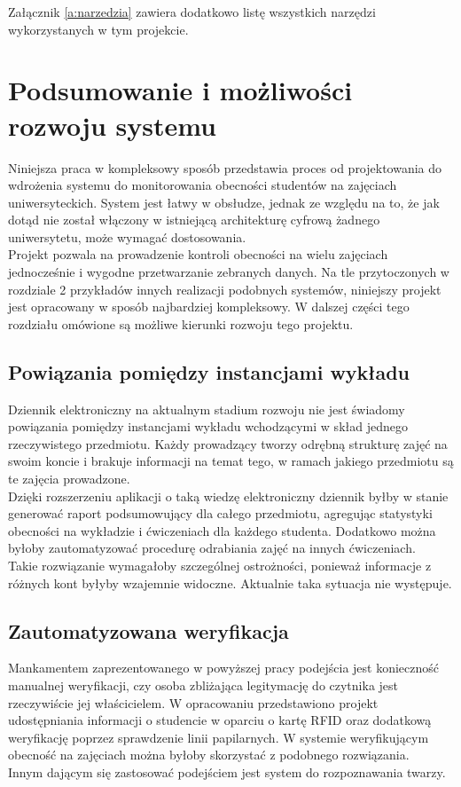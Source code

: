 \documentclass[declaration,shortabstract, mgr]{iithesis}
\begin{document}
Załącznik \ref{a:narzedzia} zawiera dodatkowo listę wszystkich narzędzi wykorzystanych w tym projekcie.

\chapter{Podsumowanie i możliwości rozwoju systemu}
\indent Niniejsza praca w kompleksowy sposób przedstawia proces od projektowania do wdrożenia systemu do monitorowania obecności studentów na zajęciach uniwersyteckich. System jest łatwy w obsłudze, jednak ze względu na to, że jak dotąd nie został włączony w istniejącą architekturę cyfrową żadnego uniwersytetu, może wymagać dostosowania. \\
\indent Projekt pozwala na prowadzenie kontroli obecności na wielu zajęciach jednocześnie i wygodne przetwarzanie zebranych danych. Na tle przytoczonych w rozdziale 2 przykładów innych realizacji podobnych systemów, niniejszy projekt jest opracowany w sposób najbardziej kompleksowy. W dalszej części tego rozdziału omówione są możliwe kierunki rozwoju tego projektu.

\section{Powiązania pomiędzy instancjami wykładu}
\indent Dziennik elektroniczny na aktualnym stadium rozwoju nie jest świadomy powiązania pomiędzy instancjami wykładu wchodzącymi w skład jednego rzeczywistego przedmiotu. Każdy prowadzący tworzy odrębną strukturę zajęć na swoim koncie i brakuje informacji na temat tego, w ramach jakiego przedmiotu są te zajęcia prowadzone. \\
\indent Dzięki rozszerzeniu aplikacji o taką wiedzę elektroniczny dziennik byłby w stanie generować raport podsumowujący dla całego przedmiotu, agregując statystyki obecności na wykładzie i ćwiczeniach dla każdego studenta. Dodatkowo można byłoby zautomatyzować procedurę odrabiania zajęć na innych ćwiczeniach. \\
\indent Takie rozwiązanie wymagałoby szczególnej ostrożności, ponieważ informacje z różnych kont byłyby wzajemnie widoczne. Aktualnie taka sytuacja nie występuje.
\section{Zautomatyzowana weryfikacja}
\indent Mankamentem zaprezentowanego w powyższej pracy podejścia jest konieczność manualnej weryfikacji, czy osoba zbliżająca legitymację do czytnika jest rzeczywiście jej właścicielem. W opracowaniu \cite{fingerprint} przedstawiono projekt udostępniania informacji o studencie w oparciu o kartę RFID oraz dodatkową weryfikację poprzez sprawdzenie linii papilarnych. W systemie weryfikującym obecność na zajęciach można byłoby skorzystać z podobnego rozwiązania.\\
\indent Innym dającym się zastosować podejściem jest system do rozpoznawania twarzy.
\end{document}
